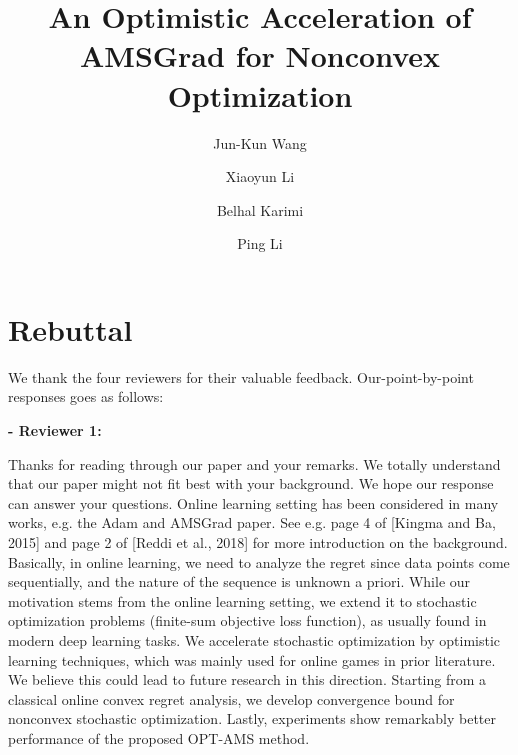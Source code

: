 \documentclass{article}
\title{An Optimistic Acceleration of AMSGrad for Nonconvex Optimization}
\author{Jun-Kun Wang \and Xiaoyun Li \and Belhal Karimi \and Ping Li}
\date{}
\begin{document}
\maketitle

\section{Rebuttal}

We thank the four reviewers for their valuable feedback. 
Our-point-by-point responses goes as follows:



\textbf{- Reviewer 1:}

Thanks for reading through our paper and your remarks. 
We totally understand that our paper might not fit best with your background. We hope our response can answer your questions.
Online learning setting has been considered in many works, e.g. the Adam and AMSGrad paper. See e.g. page 4 of [Kingma and Ba, 2015] and page 2 of [Reddi et al., 2018] for more introduction on the background. 
Basically, in online learning, we need to analyze the regret since data points come sequentially, and the nature of the sequence is unknown a priori. 
While our motivation stems from the online learning setting, we extend it to stochastic optimization problems (finite-sum objective loss function), as usually found in modern deep learning tasks. 
We accelerate stochastic optimization by optimistic learning techniques, which was mainly used for online games in prior literature. 
We believe this could lead to future research in this direction. 
Starting from a classical online convex regret analysis, we develop convergence bound for nonconvex stochastic optimization. 
Lastly, experiments show remarkably better performance of the proposed OPT-AMS method.


\end{document}
